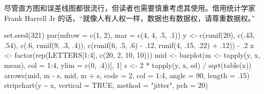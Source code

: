 \documentclass[
  b5paper,
  UTF8,twoside]{book}
\newenvironment{Shaded}{\begin{snugshade}}{\end{snugshade}}
\newcommand{\AttributeTok}[1]{\textcolor[rgb]{0.77,0.63,0.00}{#1}}
\newcommand{\ConstantTok}[1]{\textcolor[rgb]{0.00,0.00,0.00}{#1}}
\newcommand{\DecValTok}[1]{\textcolor[rgb]{0.00,0.00,0.81}{#1}}
\newcommand{\FunctionTok}[1]{\textcolor[rgb]{0.00,0.00,0.00}{#1}}
\newcommand{\NormalTok}[1]{#1}
\newcommand{\OtherTok}[1]{\textcolor[rgb]{0.56,0.35,0.01}{#1}}
\newcommand{\SpecialCharTok}[1]{\textcolor[rgb]{0.00,0.00,0.00}{#1}}
\newcommand{\StringTok}[1]{\textcolor[rgb]{0.31,0.60,0.02}{#1}}
\begin{document}
尽管直方图和误差线图都很流行，但读者也需要慎重考虑其使用。借用统计学家 Frank Harrell Jr 的话，``就像人有人权一样，数据也有数据权，请尊重数据权。''

\begin{Shaded}
\begin{Highlighting}[]
\FunctionTok{set.seed}\NormalTok{(}\DecValTok{321}\NormalTok{)}
\FunctionTok{par}\NormalTok{(}\AttributeTok{mfrow =} \FunctionTok{c}\NormalTok{(}\DecValTok{1}\NormalTok{, }\DecValTok{2}\NormalTok{), }\AttributeTok{mar =} \FunctionTok{c}\NormalTok{(}\DecValTok{4}\NormalTok{, }\DecValTok{4}\NormalTok{, .}\DecValTok{5}\NormalTok{, .}\DecValTok{1}\NormalTok{))}
\NormalTok{y }\OtherTok{\textless{}{-}} \FunctionTok{c}\NormalTok{(}\FunctionTok{runif}\NormalTok{(}\DecValTok{20}\NormalTok{), }\FunctionTok{c}\NormalTok{(.}\DecValTok{43}\NormalTok{, .}\DecValTok{54}\NormalTok{), }\FunctionTok{c}\NormalTok{(.}\DecValTok{6}\NormalTok{, }\FunctionTok{runif}\NormalTok{(}\DecValTok{9}\NormalTok{, .}\DecValTok{3}\NormalTok{, .}\DecValTok{4}\NormalTok{)), }
       \FunctionTok{c}\NormalTok{(}\FunctionTok{runif}\NormalTok{(}\DecValTok{6}\NormalTok{, .}\DecValTok{5}\NormalTok{, .}\DecValTok{6}\NormalTok{) }\SpecialCharTok{{-}}\NormalTok{ .}\DecValTok{12}\NormalTok{, }\FunctionTok{runif}\NormalTok{(}\DecValTok{4}\NormalTok{, .}\DecValTok{15}\NormalTok{, .}\DecValTok{22}\NormalTok{) }\SpecialCharTok{+}\NormalTok{ .}\DecValTok{12}\NormalTok{)) }\SpecialCharTok{{-}}\NormalTok{ .}\DecValTok{2}
\NormalTok{x }\OtherTok{\textless{}{-}} \FunctionTok{factor}\NormalTok{(}\FunctionTok{rep}\NormalTok{(LETTERS[}\DecValTok{1}\SpecialCharTok{:}\DecValTok{4}\NormalTok{], }\FunctionTok{c}\NormalTok{(}\DecValTok{20}\NormalTok{, }\DecValTok{2}\NormalTok{, }\DecValTok{10}\NormalTok{, }\DecValTok{10}\NormalTok{)))}
\NormalTok{mid }\OtherTok{\textless{}{-}} \FunctionTok{barplot}\NormalTok{(m }\OtherTok{\textless{}{-}} \FunctionTok{tapply}\NormalTok{(y, x, mean), }\AttributeTok{col =} \DecValTok{1}\SpecialCharTok{:}\DecValTok{4}\NormalTok{, }\AttributeTok{ylim =} \FunctionTok{c}\NormalTok{(}\DecValTok{0}\NormalTok{, .}\DecValTok{4}\NormalTok{))[, }\DecValTok{1}\NormalTok{]}
\NormalTok{s }\OtherTok{\textless{}{-}} \DecValTok{2} \SpecialCharTok{*} \FunctionTok{tapply}\NormalTok{(y, x, sd) }\SpecialCharTok{/} \FunctionTok{sqrt}\NormalTok{(}\FunctionTok{table}\NormalTok{(x))}
\FunctionTok{arrows}\NormalTok{(mid, m }\SpecialCharTok{{-}}\NormalTok{ s, mid, m }\SpecialCharTok{+}\NormalTok{ s, }\AttributeTok{code =} \DecValTok{2}\NormalTok{, }\AttributeTok{col =} \DecValTok{1}\SpecialCharTok{:}\DecValTok{4}\NormalTok{, }\AttributeTok{angle =} \DecValTok{90}\NormalTok{, }\AttributeTok{length =}\NormalTok{ .}\DecValTok{15}\NormalTok{)}
\FunctionTok{stripchart}\NormalTok{(y }\SpecialCharTok{\textasciitilde{}}\NormalTok{ x, }\AttributeTok{vertical =} \ConstantTok{TRUE}\NormalTok{, }\AttributeTok{method =} \StringTok{"jitter"}\NormalTok{, }\AttributeTok{pch =} \DecValTok{20}\NormalTok{)}
\end{Highlighting}
\end{Shaded}
\end{document}
